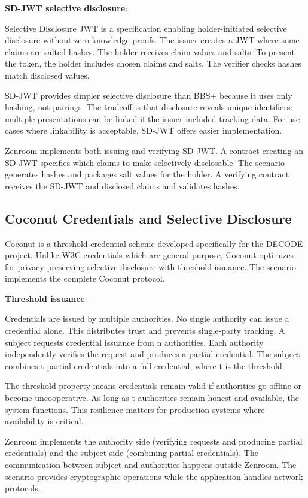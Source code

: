\textbf{SD-JWT selective disclosure}:

Selective Disclosure JWT is a specification enabling holder-initiated
selective disclosure without zero-knowledge proofs. The issuer creates
a JWT where some claims are salted hashes. The holder receives claim
values and salts. To present the token, the holder includes chosen
claims and salts. The verifier checks hashes match disclosed values.

SD-JWT provides simpler selective disclosure than BBS+ because it uses
only hashing, not pairings. The tradeoff is that disclosure reveals
unique identifiers: multiple presentations can be linked if the issuer
included tracking data. For use cases where linkability is acceptable,
SD-JWT offers easier implementation.

Zenroom implements both issuing and verifying SD-JWT. A contract
creating an SD-JWT specifies which claims to make selectively
disclosable. The scenario generates hashes and packages salt values
for the holder. A verifying contract receives the SD-JWT and disclosed
claims and validates hashes.

\subsection{Coconut Credentials and Selective Disclosure}

Coconut is a threshold credential scheme developed specifically for
the DECODE project. Unlike W3C credentials which are general-purpose,
Coconut optimizes for privacy-preserving selective disclosure with
threshold issuance. The scenario implements the complete Coconut
protocol.

\textbf{Threshold issuance}:

Credentials are issued by multiple authorities. No single authority
can issue a credential alone. This distributes trust and prevents
single-party tracking. A subject requests credential issuance from n
authorities. Each authority independently verifies the request and
produces a partial credential. The subject combines t partial
credentials into a full credential, where t is the threshold.

The threshold property means credentials remain valid if authorities
go offline or become uncooperative. As long as t authorities remain
honest and available, the system functions. This resilience matters
for production systems where availability is critical.

Zenroom implements the authority side (verifying requests and
producing partial credentials) and the subject side (combining partial
credentials). The communication between subject and authorities
happens outside Zenroom. The scenario provides cryptographic
operations while the application handles network protocols.

